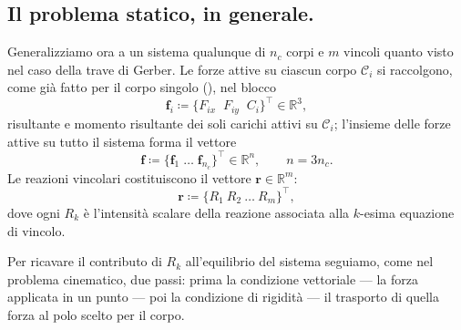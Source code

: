 \subsection{Il problema statico, in generale.}
Generalizziamo ora a un sistema qualunque di $n_c$ corpi e $m$ vincoli
quanto visto nel caso della trave di Gerber. Le forze attive su
ciascun corpo $\mathcal C_i$ si raccolgono, come già fatto per il
corpo singolo (), nel blocco
\begin{equation}
	\bm f_i \coloneqq \bigl\{F_{ix} \;\; F_{iy}  \;\; C_i\bigr\}^{\!\top}\in\mathbb R^3,
\end{equation}
risultante e momento risultante dei soli carichi attivi su
$\mathcal C_i$; l'insieme delle forze attive su tutto il sistema forma
il vettore
\begin{equation}
	\bm f \coloneqq \{\bm f_1\;\dots\;\bm f_{n_c}\}^{\!\top}\in\mathbb R^n,
	\qquad n=3n_c.
\end{equation}
Le reazioni vincolari costituiscono il vettore
$\bm{r} \in \mathbb{R}^{m}$:
\begin{equation}
	\bm{r} \coloneqq
	\bigl\{R_1\ R_2 \ \dots\ R_m\bigr\}^{\!\top},
\end{equation}
dove ogni $R_k$ è l'intensità scalare della reazione associata
alla $k$-esima equazione di vincolo.
\medskip

Per ricavare il contributo di $R_k$ all'equilibrio del sistema
seguiamo, come nel problema cinematico, due passi: prima la
condizione vettoriale --- la forza applicata in un punto --- poi la
condizione di rigidità --- il trasporto di quella forza al polo
scelto per il corpo.

